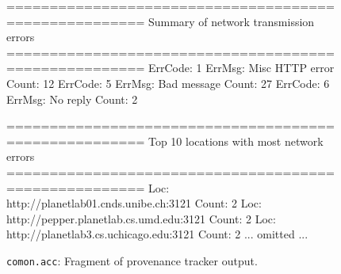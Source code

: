  



\begin{figure}[t]
\centering
\begin{scodebox}
======================================================
Summary of network transmission errors
======================================================
ErrCode: 1      ErrMsg: Misc HTTP error Count: 12
ErrCode: 5      ErrMsg: Bad message     Count: 27
ErrCode: 6      ErrMsg: No reply        Count: 2

======================================================
Top 10 locations with most network errors
======================================================
Loc: http://planetlab01.cnds.unibe.ch:3121    Count: 2
Loc: http://pepper.planetlab.cs.umd.edu:3121  Count: 2
Loc: http://planetlab3.cs.uchicago.edu:3121   Count: 2
... omitted ...
\end{scodebox}
\caption{\texttt{comon.acc}: Fragment of provenance tracker output.} \label{fig:acc}
\end{figure} 



